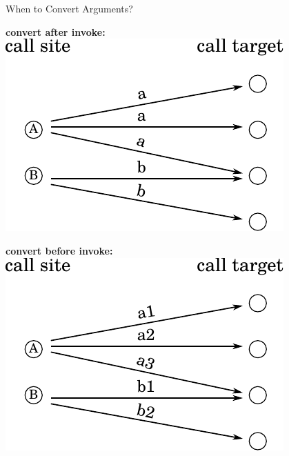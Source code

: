 \documentclass[xcolor=dvipsname]{beamer} %
\begin{document}
\begin{frame}{When to Convert Arguments?}
\begin{minipage}{0.49\textwidth}
\begin{table}
\centering
\textbf{convert after invoke:} \newline \newline
\includegraphics[width=0.8\textwidth]{pic_regular.pdf}
\end{table}
\end{minipage} %
\begin{minipage}{0.49\textwidth}
\begin{table}
\centering
\textbf{convert before invoke:} \newline \newline
\includegraphics[width=0.8\textwidth]{pic_calltarget.pdf}
\end{table}
\end{minipage}
\end{frame}
\end{document}
